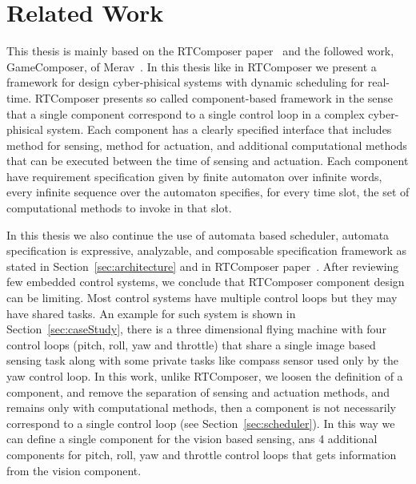 \documentclass[ twoside, 12pt ]{article}
\begin{document}
\section{Related Work}

This thesis is mainly based on the RTComposer paper~\cite{RTComposer} and the followed work, GameComposer, of Merav~\cite{Merav}.
In this thesis like in RTComposer we present a framework for design cyber-phisical systems with dynamic scheduling for real-time.
RTComposer presents so called component-based framework in the sense that a single component correspond to a single control loop in a complex cyber-phisical system.
Each component has a clearly specified interface that includes method for sensing, method for actuation, and additional computational methods that can be executed between the time of sensing and actuation.
Each component have requirement specification given by finite automaton over infinite words, every infinite sequence over the automaton specifies, for every time slot, the set of computational methods to invoke in that slot.

In this thesis we also continue the use of automata based scheduler, automata specification is expressive, analyzable, and composable specification framework as stated in Section~\ref{sec:architecture} and in RTComposer paper~\cite{RTComposer}.
After reviewing few embedded control systems, we conclude that RTComposer component design can be limiting. 
Most control systems have multiple control loops but they may have shared tasks.
An example for such system is shown in Section~\ref{sec:caseStudy}, there is a three dimensional flying machine with four control loops (pitch, roll, yaw and throttle) that share a single image based sensing task along with some private tasks like compass sensor used only by the yaw control loop.
In this work, unlike RTComposer, we loosen the definition of a component, and remove the separation of sensing and actuation methods, and remains only with computational methods, then a component is not necessarily correspond to a single control loop (see Section~\ref{sec:scheduler}). 
In this way we can define a single component for the vision based sensing, ans 4 additional components for pitch, roll, yaw and throttle control loops that gets information from the vision component.
\end{document}
